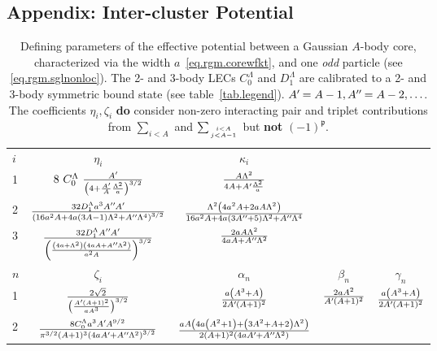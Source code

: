 \documentclass[aps,nofootinbib,prl,showpacs,twocolumn,groupedaddress,superscriptaddress]
{revtex4}
\newcommand*{\mprime}{^{\prime}\mkern-1.2mu}
\newcommand*{\mdprime}{^{\prime\prime}\mkern-1.2mu}
\begin{document}
\newpage

\begin{widetext}
\begin{turnpage}
\section{Appendix: Inter-cluster Potential}
\begin{table}
\setlength{\tabcolsep}{4pt}
\renewcommand{\arraystretch}{2.4}
\caption{\label{tab.rgmpot}{Defining parameters of the effective potential between
a Gaussian $A$-body core, characterized via the width $a$~\eqref{eq.rgm.corewfkt},
and one {\it odd} particle (see \eqref{eq.rgm.sglnonloc}).
The 2- and 3-body LECs $C^\Lambda_0$ and $D^\Lambda_1$ are
calibrated to a 2- and 3-body symmetric bound state (see table~\ref{tab.legend}).
$A\mprime=A-1, A\mdprime=A-2, \ldots$. The coefficients $\eta_i,\zeta_i$ {\bf do}
consider non-zero interacting pair and triplet contributions from $\sum_{i<A}$ and
$\sum_{i<A\atop j<A-1}$ but {\bf not} $(-1)^{\mathfrak{p}}$.}}
\small\centering
\begin{tabular}{lc|ccc}
\hline\hline
$i$ & $\eta_i$ & $\kappa_i$ & & \\
1   & $8~C_0^\Lambda~\frac{A\mprime}{\left(4+\frac{A\mprime}{A}\frac{\Lambda^2}{a}\right)^{3/2}}$  & $\frac{A\Lambda^2}{4A+A\mprime\frac{\Lambda^2}{a}}$ \\
2   & $
\frac{32 D_1^\Lambda a^3 A\mdprime A\mprime}{\left(16 a^2 A+4 a (3 A-1) \Lambda ^2+A\mdprime \Lambda ^4\right)^{3/2}}$ & $\frac{\Lambda ^2 \left(4 a^2 A+2 a A \Lambda ^2\right)}{16 a^2 A+4 a (3 A\mdprime+5) \Lambda ^2+A\mdprime \Lambda ^4}$ \\
3 & 
$\frac{32 D_1^\Lambda A\mdprime A\mprime}{\left(\frac{\left(4 a+\Lambda ^2\right) \left(4 a A+A\mdprime \Lambda ^2\right)}{a^2 A}\right)^{3/2}}$ & $\frac{2 a A \Lambda ^2}{4 a A+A\mdprime \Lambda ^2}$ \\
\hline
$n$ & $\zeta_i$ & $\alpha_n$ & $\beta_n$ & $\gamma_n$ \\
1 &$\frac{2 \sqrt{2}}{\left(\frac{A\mprime (A+1)^2}{a A^3}\right)^{3/2}}$&
$\frac{a \left(A^3+A\right)}{2 A\mprime (A+1)^2}$&
$\frac{2 a A^2}{A\mprime (A+1)^2}$&
$\frac{a \left(A^3+A\right)}{2 A\mprime (A+1)^2}$\\
2 & 
$ \frac{8 C_0^\Lambda a^3 A\mprime A^{9/2}}{\pi ^{3/2} (A+1)^3 \left(4 a A\mprime+A\mdprime \Lambda ^2\right)^{3/2}}  $ & 
$\frac{\text{} a A \left(4 a \left(A^2+1\right)+\left(3 A^2+A+2\right) \Lambda ^2\right)}{2 (A+1)^2 \left(4 a A\mprime+A\mdprime \Lambda ^2\right)}$&

\end{tabular}
\end{table}
\end{turnpage}
\end{widetext}
\end{document}
